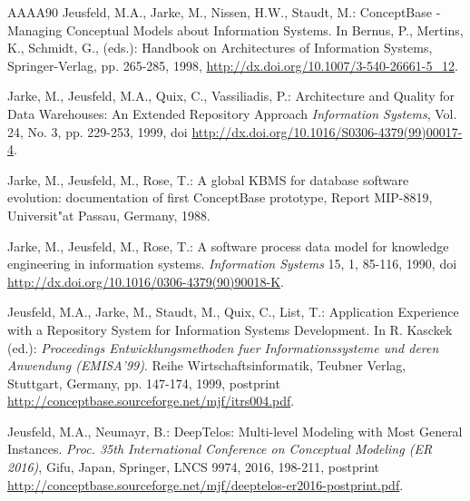 \begin{thebibliography}{AAAA90}
Jeusfeld, M.A., Jarke, M., Nissen, H.W., Staudt, M.:
ConceptBase - Managing Conceptual Models about Information Systems.
In Bernus, P., Mertins, K., Schmidt, G., (eds.):
Handbook on Architectures of Information Systems, Springer-Verlag, pp. 265-285, 1998,
\url{http://dx.doi.org/10.1007/3-540-26661-5_12}.

 Jarke, M., Jeusfeld, M.A., Quix, C., Vassiliadis, P.:
Architecture and Quality for Data Warehouses: An Extended Repository Approach
{\em Information Systems}, Vol. 24, No. 3, pp. 229-253, 1999,
doi \url{http://dx.doi.org/10.1016/S0306-4379(99)00017-4}.

 Jarke, M., Jeusfeld, M., Rose, T.: A global KBMS for database
software evolution: documentation of first ConceptBase prototype,
Report MIP-8819, Universit"at Passau, Germany, 1988.

 Jarke, M., Jeusfeld, M., Rose, T.: A software process
data model for knowledge engineering in information systems.
{\it Information Systems\/} 15, 1, 85-116, 1990,
doi \url{http://dx.doi.org/10.1016/0306-4379(90)90018-K}.

Jeusfeld, M.A., Jarke, M., Staudt, M., Quix, C., List, T.:
Application Experience with a Repository System for Information Systems Development.
In R. Kasckek (ed.): {\em Proceedings Entwicklungsmethoden fuer Informationssysteme und deren Anwendung (EMISA'99)}.
Reihe Wirtschaftsinformatik, Teubner Verlag, Stuttgart, Germany, pp. 147-174, 1999,
postprint \url{http://conceptbase.sourceforge.net/mjf/itrs004.pdf}.




  Jeusfeld, M.A., Neumayr, B.:
DeepTelos: Multi-level Modeling with Most General Instances.
{\em Proc. 35th International Conference on Conceptual Modeling (ER 2016)}, Gifu, Japan,
Springer, LNCS 9974, 2016, 198-211,
postprint \url{http://conceptbase.sourceforge.net/mjf/deeptelos-er2016-postprint.pdf}.


\end{thebibliography}
